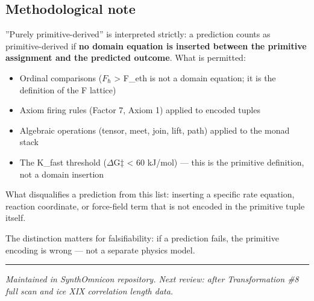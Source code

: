\documentclass[12pt,a4paper]{article}
\begin{document}
\subsection{Methodological note}

''Purely primitive-derived'' is interpreted strictly: a prediction counts as primitive-derived if \textbf{no domain equation is inserted between the primitive assignment and the predicted outcome}. What is permitted:

\begin{itemize}
    \item Ordinal comparisons ($F_{\hbar}$ \textgreater{} F\_eth is not a domain equation; it is the definition of the F lattice)
    \item Axiom firing rules (Factor 7, Axiom 1) applied to encoded tuples
    \item Algebraic operations (tensor, meet, join, lift, path) applied to the monad stack
    \item The K\_fast threshold ($\Delta$G‡ \textless{} 60 kJ/mol) --- this is the primitive definition, not a domain insertion
\end{itemize}

What disqualifies a prediction from this list: inserting a specific rate equation, reaction coordinate, or force-field term that is not encoded in the primitive tuple itself.

The distinction matters for falsifiability: if a prediction fails, the primitive encoding is wrong --- not a separate physics model.

\begin{center}
\rule{0.5\textwidth}{0.4pt}
\end{center}

\emph{Maintained in SynthOmnicon repository. Next review: after Transformation \#8 full scan and ice XIX correlation length data.}
\end{document}
